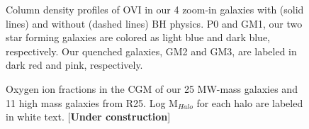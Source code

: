 \documentclass[]{emulateapj}
\begin{document}
\begin{figure}[h!]
\centerline{}
\caption[]{Column density profiles of OVI in our 4 zoom-in galaxies with (solid lines) and without (dashed lines) BH physics. P0 and GM1, our two star forming galaxies are colored as light blue and dark blue, respectively. Our quenched galaxies, GM2 and GM3, are labeled in dark red and pink, respectively.}
\label{GMandNOBH_Novi_vs_b}
\end{figure}

\begin{figure}[ht!]
\centerline{}
\caption[]{Oxygen ion fractions in the CGM of our 25 MW-mass galaxies and 11 high mass galaxies from R25. Log M$_{Halo}$ for each halo are labeled in white text. [\textbf{Under construction}]}
\label{oppenheimer}
\end{figure}
\end{document}
